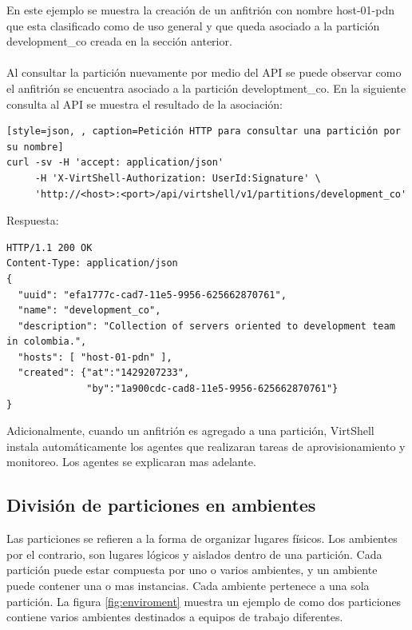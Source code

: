En este ejemplo se muestra la creación de un anfitrión con nombre host-01-pdn que esta clasificado como de uso general y que queda asociado a la partición development\_co creada en la sección anterior.\\
\\
Al consultar la partición nuevamente por medio del API se puede observar como el anfitrión se encuentra asociado a la partición developtment\_co. En la siguiente consulta al API se muestra el resultado de la asociación:

\vspace{5mm} 

\begin{lstlisting}[style=json, , caption=Petición HTTP para consultar una partición por su nombre]
curl -sv -H 'accept: application/json' 
     -H 'X-VirtShell-Authorization: UserId:Signature' \ 
     'http://<host>:<port>/api/virtshell/v1/partitions/development_co'
\end{lstlisting}

\vspace{5mm}

Respuesta:

\vspace{5mm}

\begin{lstlisting}[style=json]
HTTP/1.1 200 OK
Content-Type: application/json
{
  "uuid": "efa1777c-cad7-11e5-9956-625662870761",
  "name": "development_co",
  "description": "Collection of servers oriented to development team in colombia.", 
  "hosts": [ "host-01-pdn" ],  
  "created": {"at":"1429207233", 
              "by":"1a900cdc-cad8-11e5-9956-625662870761"}
}
\end{lstlisting}

\vspace{5mm}

Adicionalmente, cuando un anfitrión es agregado a una partición, VirtShell instala automáticamente los agentes  que realizaran tareas de aprovisionamiento y monitoreo. Los agentes se explicaran mas adelante.

\subsection{División de particiones en ambientes}
Las particiones se refieren a la forma de organizar lugares físicos. Los ambientes por el contrario, son lugares lógicos y aislados dentro de una partición. Cada partición puede estar compuesta por uno o varios ambientes, y un ambiente puede contener una o mas instancias. Cada ambiente pertenece a una sola partición. La figura \ref{fig:enviroment} muestra un ejemplo de como dos particiones contiene varios ambientes destinados a equipos de trabajo diferentes. \\

